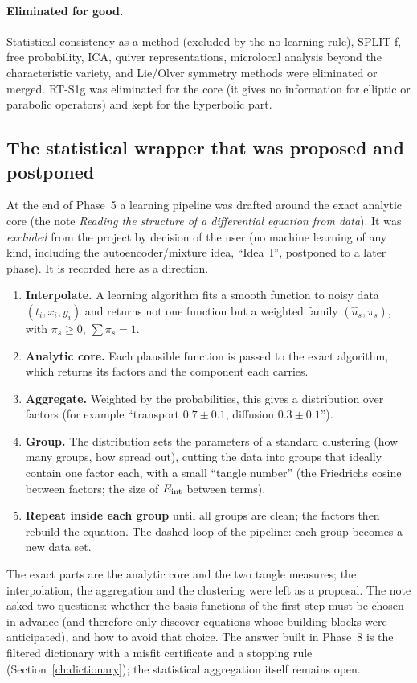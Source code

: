\paragraph{Eliminated for good.} Statistical consistency as a method (excluded by the no-learning rule), SPLIT-f, free probability, ICA, quiver representations, microlocal analysis beyond the characteristic variety, and Lie/Olver symmetry methods were eliminated or merged. RT-S1g was eliminated for the core (it gives no information for elliptic or parabolic operators) and kept for the hyperbolic part.

\subsection{The statistical wrapper that was proposed and postponed}

At the end of Phase~5 a learning pipeline was drafted around the exact analytic core (the note \emph{Reading the structure of a differential equation from data}). It was \emph{excluded} from the project by decision of the user (no machine learning of any kind, including the autoencoder/mixture idea, ``Idea~I'', postponed to a later phase). It is recorded here as a direction.

\begin{enumerate}
\item \textbf{Interpolate.} A learning algorithm fits a smooth function to noisy data $(t_i,x_i,y_i)$ and returns not one function but a weighted family $(\hat u_s,\pi_s)$, with $\pi_s\ge0$, $\sum\pi_s=1$.
\item \textbf{Analytic core.} Each plausible function is passed to the exact algorithm, which returns its factors and the component each carries.
\item \textbf{Aggregate.} Weighted by the probabilities, this gives a distribution over factors (for example ``transport $0.7\pm0.1$, diffusion $0.3\pm0.1$'').
\item \textbf{Group.} The distribution sets the parameters of a standard clustering (how many groups, how spread out), cutting the data into groups that ideally contain one factor each, with a small ``tangle number'' (the Friedrichs cosine between factors; the size of $E_{\rm int}$ between terms).
\item \textbf{Repeat inside each group} until all groups are clean; the factors then rebuild the equation. The dashed loop of the pipeline: each group becomes a new data set.
\end{enumerate}
The exact parts are the analytic core and the two tangle measures; the interpolation, the aggregation and the clustering were left as a proposal. The note asked two questions: whether the basis functions of the first step must be chosen in advance (and therefore only discover equations whose building blocks were anticipated), and how to avoid that choice. The answer built in Phase~8 is the filtered dictionary with a misfit certificate and a stopping rule (Section~\ref{ch:dictionary}); the statistical aggregation itself remains open.

